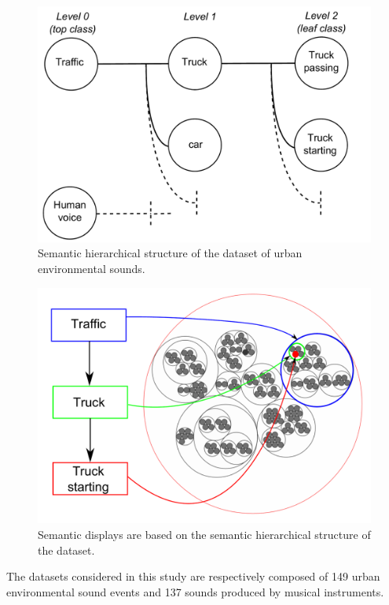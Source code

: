 \documentclass{aes2e}
\begin{document}
\begin{figure}[t]
\begin{center}
\includegraphics[scale=0.24]{gfx/dataset.pdf} 
\end{center}
\caption{\label{figdataset} Semantic hierarchical structure of the dataset of urban environmental sounds.}
\end{figure}

\begin{figure}[t]
\begin{center}
\includegraphics[scale=0.24]{gfx/SSF.pdf} 
\end{center}
\caption{\label{figSSF} Semantic displays are  based on the semantic hierarchical structure of the dataset.}
\end{figure}


The datasets considered in this study are respectively composed of 149 urban environmental sound events and 137 sounds produced by musical instruments. 
\end{document}
